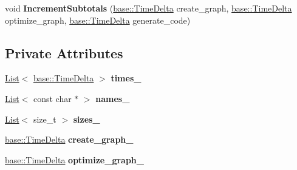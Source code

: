 \begin{DoxyCompactItemize}
\item 
void {\bfseries Increment\+Subtotals} (\hyperlink{classv8_1_1base_1_1_time_delta}{base\+::\+Time\+Delta} create\+\_\+graph, \hyperlink{classv8_1_1base_1_1_time_delta}{base\+::\+Time\+Delta} optimize\+\_\+graph, \hyperlink{classv8_1_1base_1_1_time_delta}{base\+::\+Time\+Delta} generate\+\_\+code)\hypertarget{classv8_1_1internal_1_1_h_statistics_a731fbb90adc4ae9a7478b10ded6c2eb1}{}\label{classv8_1_1internal_1_1_h_statistics_a731fbb90adc4ae9a7478b10ded6c2eb1}

\end{DoxyCompactItemize}
\subsection*{Private Attributes}
\begin{DoxyCompactItemize}
\item 
\hyperlink{classv8_1_1internal_1_1_list}{List}$<$ \hyperlink{classv8_1_1base_1_1_time_delta}{base\+::\+Time\+Delta} $>$ {\bfseries times\+\_\+}\hypertarget{classv8_1_1internal_1_1_h_statistics_acaaad448385fe73f54569146d38a97a7}{}\label{classv8_1_1internal_1_1_h_statistics_acaaad448385fe73f54569146d38a97a7}

\item 
\hyperlink{classv8_1_1internal_1_1_list}{List}$<$ const char $\ast$ $>$ {\bfseries names\+\_\+}\hypertarget{classv8_1_1internal_1_1_h_statistics_a2e83d7230a226fdc754c0296e2727291}{}\label{classv8_1_1internal_1_1_h_statistics_a2e83d7230a226fdc754c0296e2727291}

\item 
\hyperlink{classv8_1_1internal_1_1_list}{List}$<$ size\+\_\+t $>$ {\bfseries sizes\+\_\+}\hypertarget{classv8_1_1internal_1_1_h_statistics_adc47582565f6ffc46a7e61a0b3ce9f86}{}\label{classv8_1_1internal_1_1_h_statistics_adc47582565f6ffc46a7e61a0b3ce9f86}

\item 
\hyperlink{classv8_1_1base_1_1_time_delta}{base\+::\+Time\+Delta} {\bfseries create\+\_\+graph\+\_\+}\hypertarget{classv8_1_1internal_1_1_h_statistics_a72e3828ebb486a887c9ab90e3ae27746}{}\label{classv8_1_1internal_1_1_h_statistics_a72e3828ebb486a887c9ab90e3ae27746}

\item 
\hyperlink{classv8_1_1base_1_1_time_delta}{base\+::\+Time\+Delta} {\bfseries optimize\+\_\+graph\+\_\+}\hypertarget{classv8_1_1internal_1_1_h_statistics_aca06e71c398d44ec0bd07435150f8ce6}{}\label{classv8_1_1internal_1_1_h_statistics_aca06e71c398d44ec0bd07435150f8ce6}


\end{DoxyCompactItemize}
